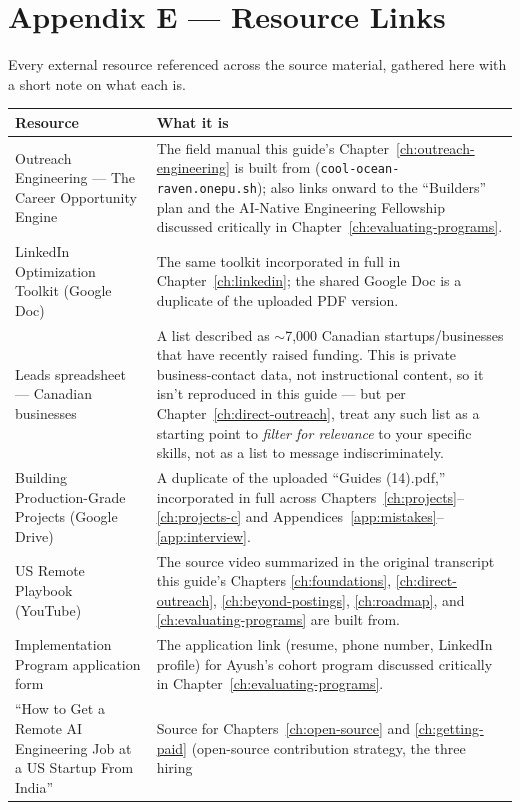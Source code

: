 \section{Appendix E --- Resource Links}
\label{app:links}

Every external resource referenced across the source material, gathered here with a short note on what each is.

\begin{longtable}{p{} p{}}
\toprule
\textbf{Resource} & \textbf{What it is} \\
\midrule
\endhead
Outreach Engineering --- The Career Opportunity Engine & The field manual this guide's Chapter~\ref{ch:outreach-engineering}
is built from (\texttt{cool-ocean-raven.onepu.sh}); also links onward to the ``Builders'' plan and the AI-Native
Engineering Fellowship discussed critically in Chapter~\ref{ch:evaluating-programs}. \\
LinkedIn Optimization Toolkit (Google Doc) & The same toolkit incorporated in full in Chapter~\ref{ch:linkedin};
the shared Google Doc is a duplicate of the uploaded PDF version. \\
Leads spreadsheet --- Canadian businesses & A list described as $\sim$7,000 Canadian startups/businesses that
have recently raised funding. This is private business-contact data, not instructional content, so it isn't
reproduced in this guide --- but per Chapter~\ref{ch:direct-outreach}, treat any such list as a starting point to
\emph{filter for relevance} to your specific skills, not as a list to message indiscriminately. \\
Building Production-Grade Projects (Google Drive) & A duplicate of the uploaded ``Guides (14).pdf,'' incorporated
in full across Chapters~\ref{ch:projects}--\ref{ch:projects-c} and Appendices~\ref{app:mistakes}--\ref{app:interview}.
\\
US Remote Playbook (YouTube) & The source video summarized in the original transcript this guide's Chapters
\ref{ch:foundations}, \ref{ch:direct-outreach}, \ref{ch:beyond-postings}, \ref{ch:roadmap}, and
\ref{ch:evaluating-programs} are built from. \\
Implementation Program application form & The application link (resume, phone number, LinkedIn profile) for
Ayush's cohort program discussed critically in Chapter~\ref{ch:evaluating-programs}. \\
``How to Get a Remote AI Engineering Job at a US Startup From India'' & Source for
Chapters~\ref{ch:open-source} and \ref{ch:getting-paid} (open-source contribution strategy, the three hiring

\end{longtable}
